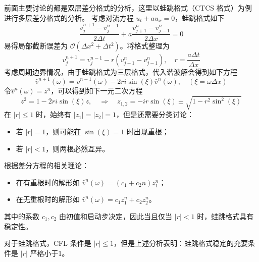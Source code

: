 前面主要讨论的都是双层差分格式的分析，这里以蛙跳格式（CTCS 格式）为例进行多层差分格式的分析。
考虑对流方程 $u_t + a u_x = 0$，蛙跳格式如下
\[
    \frac{v_j^{n+1} - v_j^{n-1}}{2\Delta t} + a \frac{v_{j+1}^{n} - v_{j-1}^{n}}{2\Delta x} = 0
\]
易得局部截断误差为 $\mathcal{O}(\Delta x^2 + \Delta t^2)$。将格式整理为
\[
    v_j^{n+1} = v_j^{n-1} - r (v_{j+1}^n - v_{j-1}^n),\quad r = \frac{a \Delta t}{\Delta x}
\]
考虑周期边界情况，由于蛙跳格式为三层格式，代入谐波解会得到如下方程
\[
    \hat{v}^{n+1}(\omega) = \hat{v}^{n-1}(\omega) - 2 r i \sin(\xi) \hat{v}^{n}(\omega),\quad (\xi = \omega \Delta x)
\]
令$\hat{v}^n(\omega)=z^n$，可以得到如下一元二次方程
\[
    z^2 = 1 - 2 r i \sin(\xi) z, \quad \Rightarrow \quad z_{1,2} = - i r \sin(\xi) \pm \sqrt{1 - r^2 \sin^2(\xi)}
\]
在 $|r| \le 1$ 时，始终有 $|z_1| = |z_2| = 1$，但是还需要分类讨论：
\begin{itemize}
    \item 若 $|r| = 1$，则可能在 $\sin(\xi) = 1$ 时出现重根；
    \item 若 $|r| < 1$，则两根必然互异。
\end{itemize}
根据差分方程的相关理论：
\begin{itemize}
    \item 在有重根时的解形如 $\hat{v}^n(\omega) = (c_1 + c_2 n) z_1^n$；
    \item 在无重根时的解形如 $\hat{v}^n(\omega) = c_1 z_1^n + c_2 z_2^n$。
\end{itemize}
其中的系数 $c_1, c_2$ 由初值和启动步决定，因此当且仅当 $|r| < 1$ 时，蛙跳格式具有稳定性。

\begin{remark}
    对于蛙跳格式，CFL 条件是 $|r| \le 1$，但是上述分析表明：蛙跳格式稳定的充要条件是 $|r|$ 严格小于1。
\end{remark}




